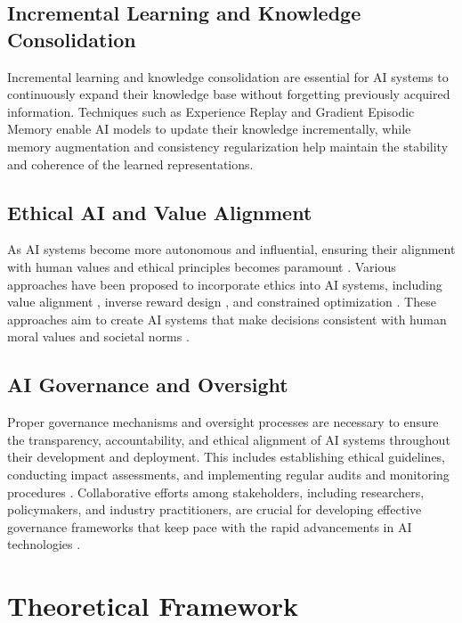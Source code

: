 \documentclass[conference]{article}
\begin{document}
	\subsection{Incremental Learning and Knowledge Consolidation}
	Incremental learning and knowledge consolidation are essential for AI systems to continuously expand their knowledge base without forgetting previously acquired information. Techniques such as Experience Replay \cite{rolnick2019experience} and Gradient Episodic Memory \cite{lopez2017gradient} enable AI models to update their knowledge incrementally, while memory augmentation \cite{rae2019compressive} and consistency regularization \cite{liang2020alice} help maintain the stability and coherence of the learned representations.
	
	\subsection{Ethical AI and Value Alignment}
	As AI systems become more autonomous and influential, ensuring their alignment with human values and ethical principles becomes paramount \cite{russell2019human}. Various approaches have been proposed to incorporate ethics into AI systems, including value alignment \cite{soares2016value}, inverse reward design \cite{hadfield2017inverse}, and constrained optimization \cite{noothigattu2018interpretable}. These approaches aim to create AI systems that make decisions consistent with human moral values and societal norms \cite{bostrom2017superintelligence}.
	
	\subsection{AI Governance and Oversight}
	Proper governance mechanisms and oversight processes are necessary to ensure the transparency, accountability, and ethical alignment of AI systems throughout their development and deployment. This includes establishing ethical guidelines, conducting impact assessments, and implementing regular audits and monitoring procedures \cite{cath2018artificial}. Collaborative efforts among stakeholders, including researchers, policymakers, and industry practitioners, are crucial for developing effective governance frameworks that keep pace with the rapid advancements in AI technologies \cite{floridi2018ai}.
	
	
	
	
	\section{Theoretical Framework}
	
\end{document}
